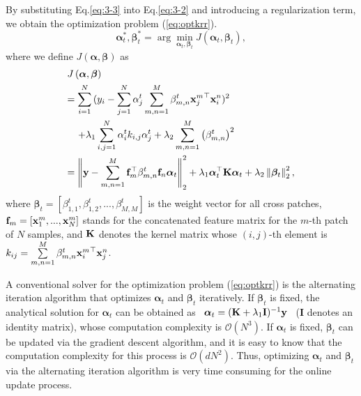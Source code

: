 \documentclass[10pt,twocolumn,letterpaper]{article}
\begin{document}
By substituting Eq.\ref{eq:3-3} into Eq.\ref{eq:3-2} and introducing a regularization term, we obtain the
optimization problem (\ref{eq:optkrr}).
\begin{equation}
{\bm{\alpha }}_t^*,{\bm{\beta }}_t^* = \arg \mathop {\min }\limits_{{{\bm{\alpha }}_t},
{{\bm{\beta }}_t}} J\left( {{{\bm{\alpha }}_t},{{\bm{\beta}}_t}} \right),
\label{eq:optkrr}
\end{equation}
where we define $J\left( {{\bm{\alpha }},{\bm{\beta }}} \right)$ as
\begin{equation}
\begin{gathered}
J\left( {{\bm{\alpha }},{\bm{\beta }}} \right) \hfill \\
   = \sum\limits_{i = 1}^N {({y_i} - \sum\limits_{j = 1}^N {\alpha _j^t\sum\limits_{m, n = 1}^M
     {\beta _{m,n}^t{\mathbf{x}}{{_j^m}^ \top }{\mathbf{x}}_i^n} {)^2}} }  \hfill \\
     \;\;\;\; + {\lambda _1}\sum\limits_{i, j = 1}^N {\alpha _i^t} {k_{i,j}}\alpha _j^t +
     {\lambda _2}\sum\limits_{m, n = 1}^M {{{\left( {\beta _{m,n}^t} \right)}^2}}  \hfill \\
   = \left\| {{\mathbf{y}} - \sum\limits_{m, n = 1}^M {{\mathbf{f}}_m^ \top \beta _{m,n}^t
     {{\mathbf{f}}_n}}{{\bm{\alpha }}_t}} \right\|_2^2 + {\lambda _1}{\bm{\alpha }}_t^ \top
     {\mathbf{K}}{{\bm{\alpha }}_t} + {\lambda _2}\left\| {{{\bm{\beta }}_t}} \right\|_2^2, \hfill \\
\end{gathered}
\label{eq:objkrr}
\end{equation}
where ${\bm{\beta}}_t=\left[\beta_{1,1}^t,\beta_{1,2}^t,...,\beta_{M,M}^t\right]$ is the
weight vector for all cross patches, ${{\bf{f}}_m} = [{\bf{x}}_1^m,...,{\bf{x}}_N^m]$
stands for the concatenated feature matrix for the $m$-th patch of $N$ samples, and
$\bf K$ denotes the kernel matrix whose $(i,j)$-th element is ${k_{ij}} = \sum\limits_{m ,n = 1}^M
{{\beta _{m,n}^t}{{{\bf{x}}_{i}^m}^\top}} {\bf{x}}_{j}^n$.

A conventional solver for the optimization problem (\ref{eq:optkrr}) is the alternating
iteration algorithm that optimizes ${\bm{\alpha}}_t$ and ${\bm{\beta}}_t$ iteratively. If
${\bm{\beta}}_t$ is fixed, the analytical solution for ${\bm \alpha}_t$ can be obtained as
$\begin{array}{l}
{\bm{\alpha }}_t = {({\bf{K}} + {\lambda _1}{\bf{I}})^{ - 1}}{\bf{y}}\\
\end{array}$  ($\mathbf{I}$ denotes an identity matrix), whose computation complexity is $\mathcal{O}(N^3)$.
If ${\bm{\alpha}}_t$ is fixed, ${\bm \beta}_t$ can be updated via the gradient descent algorithm,
and it is easy to know that the computation complexity for this process is $\mathcal{O}(dN^2)$.
Thus, optimizing ${\bm{\alpha}}_t$ and ${\bm{\beta}}_t$ via the alternating
iteration algorithm is very time consuming for the online update process.
\end{document}
